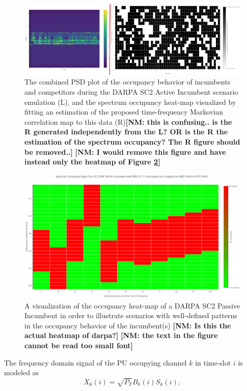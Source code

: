 \documentclass[12pt, draftcls, onecolumn]{IEEEtran}
\newcommand{\nm}[1]{{\color{blue}\bf{[NM: #1]}}}
\begin{document}
\begin{figure} [htb]
    \centerline{
    \includegraphics[width = 1.0\linewidth]{figures/Combined_PSD_Measurement_Gateway_SC2_Active_Incumbent.png}}
    \caption{The combined PSD plot of the occupancy behavior of incumbents and competitors during the DARPA SC2 Active Incumbent scenario emulation (L), and the spectrum occupancy heat-map visualized by fitting an estimation of the proposed time-frequency Markovian correlation map to this data (R)\nm{this is confusing.. is the R generated independently from the L? OR is the R the estimation of the spectrum occupancy? The R figure should be removed..}
    \nm{I would remove this figure and have instead only the heatmap of Figure \ref{fig:A.passive}}
    }
    \label{fig:A.psd}
\end{figure}
\begin{figure} [htb]
    \centerline{
    \includegraphics[width = 0.8\linewidth]{figures/SC2_Passive_Incumbent_Occupancy_Heatmap.png}}
    \caption{A visualization of the occupancy heat-map of a DARPA SC2 Passive Incumbent in order to illustrate scenarios with well-defined patterns in the occupancy behavior of the incumbent(s)
    \nm{Is this the actual heatmap of darpa?}
    \nm{the text in the figure cannot be read too small font}
    }
    \label{fig:A.passive}
\end{figure}
The frequency domain signal of the PU occupying channel $k$ in time-slot $i$ is modeled as
\begin{equation}\label{3}
    X_{k}(i)=\sqrt{P_{T}}B_{k}(i)S_{k}(i),
\end{equation}
\end{document}
